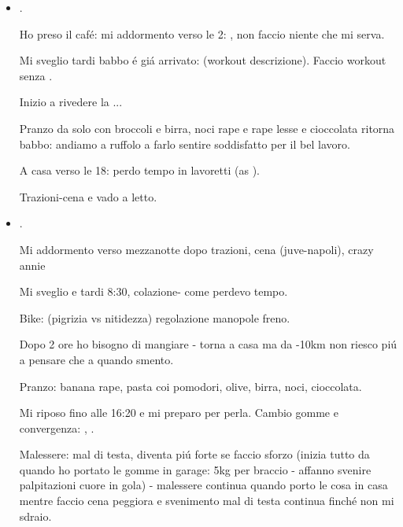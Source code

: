 \begin{itemize}
e guardo un film con protagonista un avventista del settimo giorno fino alle 17:00.

Ho fretta di andare alla conad; rinuncio con rimpianto a tornare indietro per gli interruttori.

Cerco di far emergere la .

Arrivo peruzza: se non hai niente da dirmi vado a fare la presentazione - sistemo le cose con  e penso a Addominal assoult

\item {}.

Ho preso il caf\'e: mi addormento verso le 2: , non faccio niente che mi serva.

Mi sveglio tardi babbo \'e gi\'a arrivato:  (workout descrizione). Faccio workout senza .

Inizio a rivedere la  ...

Pranzo da solo con broccoli e birra, noci rape e rape lesse e cioccolata ritorna babbo: andiamo a ruffolo a farlo sentire soddisfatto per il bel lavoro.

A casa verso le 18: perdo tempo in lavoretti (as ).

Trazioni-cena e vado a letto.

\item {}.

Mi addormento verso mezzanotte dopo trazioni, cena (juve-napoli), crazy annie

Mi sveglio e  tardi 8:30, colazione-  come perdevo tempo.

Bike:  (pigrizia vs nitidezza) regolazione manopole freno.

Dopo 2 ore ho bisogno di mangiare - torna a casa ma da -10km non riesco pi\'u a pensare  che a quando smento.

Pranzo: banana rape, pasta coi pomodori, olive, birra, noci, cioccolata.

Mi riposo fino alle 16:20 e mi preparo per perla. Cambio gomme e convergenza: , .

Malessere: mal di testa, diventa pi\'u forte se faccio sforzo (inizia tutto da quando ho portato le gomme in garage: 5kg per braccio - affanno svenire palpitazioni cuore in gola) - malessere continua quando porto le cosa in casa mentre faccio cena peggiora e svenimento mal di testa continua finch\'e non mi sdraio.


\end{itemize}
